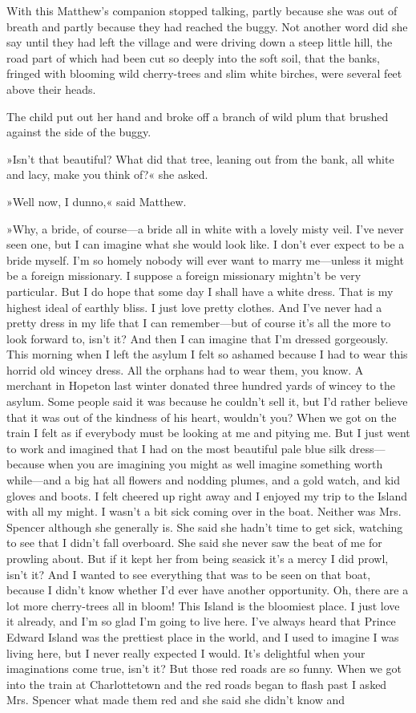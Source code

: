 With this Matthew’s companion stopped talking, partly because she was out of breath and partly because they had reached the buggy. Not another word did she say until they had left the village and were driving down a steep little hill, the road part of which had been cut so deeply into the soft soil, that the banks, fringed with blooming wild cherry-trees and slim white birches, were several feet above their heads.

The child put out her hand and broke off a branch of wild plum that brushed against the side of the buggy.

»Isn’t that beautiful? What did that tree, leaning out from the bank, all white and lacy, make you think of?« she asked.

»Well now, I dunno,« said Matthew.

»Why, a bride, of course—a bride all in white with a lovely misty veil. I’ve never seen one, but I can imagine what she would look like. I don’t ever expect to be a bride myself. I’m so homely nobody will ever want to marry me—unless it might be a foreign missionary. I suppose a foreign missionary mightn’t be very particular. But I do hope that some day I shall have a white dress. That is my highest ideal of earthly bliss. I just love pretty clothes. And I’ve never had a pretty dress in my life that I can remember—but of course it’s all the more to look forward to, isn’t it? And then I can imagine that I’m dressed gorgeously. This morning when I left the asylum I felt so ashamed because I had to wear this horrid old wincey dress. All the orphans had to wear them, you know. A merchant in Hopeton last winter donated three hundred yards of wincey to the asylum. Some people said it was because he couldn’t sell it, but I’d rather believe that it was out of the kindness of his heart, wouldn’t you? When we got on the train I felt as if everybody must be looking at me and pitying me. But I just went to work and imagined that I had on the most beautiful pale blue silk dress—because when you are imagining you might as well imagine something worth while—and a big hat all flowers and nodding plumes, and a gold watch, and kid gloves and boots. I felt cheered up right away and I enjoyed my trip to the Island with all my might. I wasn’t a bit sick coming over in the boat. Neither was Mrs. Spencer although she generally is. She said she hadn’t time to get sick, watching to see that I didn’t fall overboard. She said she never saw the beat of me for prowling about. But if it kept her from being seasick it’s a mercy I did prowl, isn’t it? And I wanted to see everything that was to be seen on that boat, because I didn’t know whether I’d ever have another opportunity. Oh, there are a lot more cherry-trees all in bloom! This Island is the bloomiest place. I just love it already, and I’m so glad I’m going to live here. I’ve always heard that Prince Edward Island was the prettiest place in the world, and I used to imagine I was living here, but I never really expected I would. It’s delightful when your imaginations come true, isn’t it? But those red roads are so funny. When we got into the train at Charlottetown and the red roads began to flash past I asked Mrs. Spencer what made them red and she said she didn’t know and 